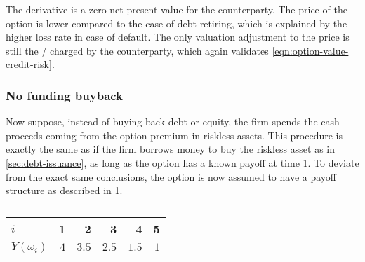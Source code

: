 \documentclass[../main.tex]{subfiles}
\begin{document}
            The derivative is a zero net present value for the counterparty. The price of the option is lower compared to the case of debt retiring, which is explained by the higher loss rate in case of default. The only valuation adjustment to the price is still the \CVA/ charged by the counterparty, which again validates \cref{eqn:option-value-credit-risk}.

        \subsubsection{No funding buyback}
            Now suppose, instead of buying back debt or equity, the firm spends the cash proceeds coming from the option premium in riskless assets. This procedure is exactly the same as if the firm borrows money to buy the riskless asset as in \cref{sec:debt-issuance}, as long as the option has a known payoff at time 1. To deviate from the exact same conclusions, the option is now assumed to have a payoff structure as described in \cref{tbl:risky-option-payoff}.
            
            \begin{table}[h]
                \centering
                \begin{tabular}{l|rrrrr}
                    $i$ & 1 & 2 & 3 & 4 & 5 \\
                    \hline
                    $Y(\omega_{i})$ & $4$ & $3.5$ & $2.5$ & $1.5$ & $1$ \\
                \end{tabular}
                \caption{}
                \label{tbl:risky-option-payoff}
            \end{table}
\end{document}
